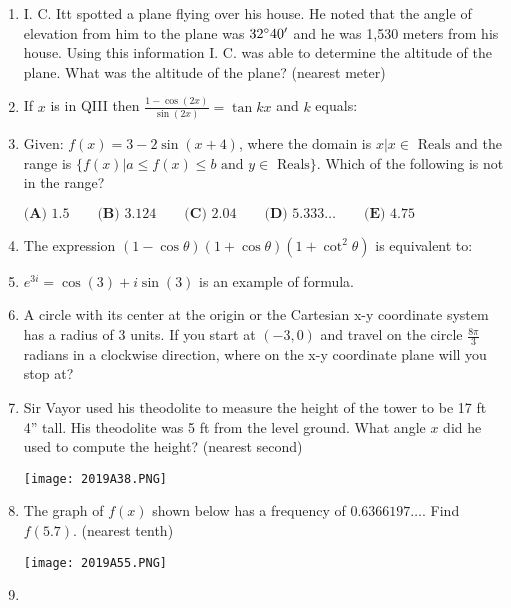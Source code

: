 \documentclass[../uilmath.tex]{subfiles}
\begin{document}
\begin{enumerate}[label=\bfseries\arabic*.]
    \item %
    I. C. Itt spotted a plane flying over his house. He noted that the angle of elevation from him to the plane was $32\degree 40'$ and he was 1,530 meters from his house.
    Using this information I. C. was able to determine the altitude of the plane. What was the altitude of the plane? (nearest meter)

    \item %
    If $x$ is in QIII then $\frac{1-\cos(2x)}{\sin(2x)} = \tan kx$ and $k$ equals: 

    \item %
    Given: $f(x)=3-2\sin(x+4)$, where the domain is ${x|x\in \text{ Reals}}$ and the range is 
    $\{f(x)|a\leq f(x)\leq b \text{ and } y\in \text{ Reals}\}$. Which of the following is not in the range?

    $\textbf{(A) } 1.5 \qquad \textbf{(B) } 3.124 \qquad \textbf{(C) } 2.04 \qquad \textbf{(D) } 5.333\dots \qquad \textbf{(E) }4.75$

    \item %
    The expression $(1-\cos\theta)(1+\cos\theta)(1+\cot^2\theta)$ is equivalent to:

    \item %
    $e^{3i}=\cos(3)+i\sin(3)$ is an example of \blank formula.

    \item %
    A circle with its center at the origin or the Cartesian x-y coordinate system has a radius of 3 units.
    If you start at $(-3,0)$ and travel on the circle $\frac{8\pi}{3}$ radians in a clockwise direction, where on the x-y coordinate plane will you stop at?

    \item %
    Sir Vayor used his theodolite to measure the height of the tower to be 17 ft 4'' tall. His theodolite was 5 ft from the level ground.
    What angle $x$ did he used to compute the height? (nearest second)
    \begin{center}
        \texttt{[image: 2019A38.PNG]}
    \end{center}

    \item %
    The graph of $f(x)$ shown below has a frequency of $0.6366197\dots$. Find $f(5.7)$. (nearest tenth)
    \begin{center}
        \texttt{[image: 2019A55.PNG]}
    \end{center}

    \item %
    

\end{enumerate}
\end{document}
